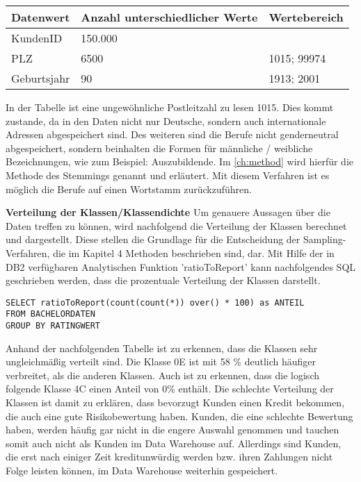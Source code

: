 \begin{tabular}[h]{l|l|l}
Datenwert & Anzahl unterschiedlicher Werte  & Wertebereich \\ \hline
KundenID & 150.000  &  \\ \hline
PLZ & 6500  & 1015; 99974 \\ \hline
Geburtsjahr & 90  & 1913; 2001 \\ 

\end{tabular}

In der Tabelle ist eine ungewöhnliche Postleitzahl zu lesen 1015. 
Dies kommt zustande, da in den Daten nicht nur Deutsche, sondern auch internationale Adressen abgespeichert sind. 
Des weiteren sind die Berufe nicht genderneutral abgespeichert, sondern beinhalten die Formen für männliche / weibliche Bezeichnungen, wie zum Beispiel: Auszubildende. 
Im \autoref{ch:method} wird hierfür die Methode des Stemmings genannt und erläutert.
Mit diesem Verfahren ist es möglich die Berufe auf einen Wortstamm zurückzuführen.


\textbf{Verteilung der Klassen/Klassendichte}
Um genauere Aussagen über die Daten treffen zu können, wird nachfolgend die Verteilung der Klassen berechnet und dargestellt. 
Diese stellen die Grundlage für die Entscheidung der Sampling-Verfahren, die im Kapitel 4 Methoden beschrieben sind, dar.
Mit Hilfe der in DB2 verfügbaren Analytischen Funktion 'ratioToReport' kann nachfolgendes SQL geschrieben werden, dass die prozentuale Verteilung der Klassen darstellt. 

\begin{verbatim}
SELECT ratioToReport(count(count(*)) over() * 100) as ANTEIL 
FROM BACHELORDATEN 
GROUP BY RATINGWERT
\end{verbatim}


Anhand der nachfolgenden Tabelle ist zu erkennen, dass die Klassen sehr ungleichmäßig verteilt sind. 
Die Klasse 0E ist mit 58 \% deutlich häufiger verbreitet, als die anderen Klassen. 
Auch ist zu erkennen, dass die logisch folgende Klasse 4C einen Anteil von 0\% enthält. 
Die schlechte Verteilung der Klassen ist damit zu erklären, dass bevorzugt Kunden einen Kredit bekommen, die auch eine gute Risikobewertung haben. 
Kunden, die eine schlechte Bewertung haben, werden häufig gar nicht in die engere Auswahl genommen und tauchen somit auch nicht als Kunden im Data Warehouse auf. 
Allerdings sind Kunden, die erst nach einiger Zeit kreditunwürdig werden bzw. ihren Zahlungen nicht Folge leisten können, im Data Warehouse weiterhin gespeichert. 

